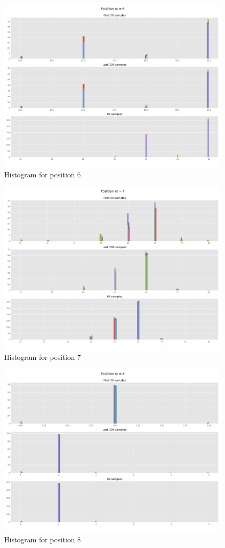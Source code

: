 \documentclass[]{article}
\begin{document}
	\begin{figure}[H]
		\begin{center}
			
			\includegraphics[width=.7\textwidth]{task4/figures/T_2_4/Q2/distribution_pos6.png}
			\caption*{Histogram for position 6}
		\end{center}
	\end{figure}
	
	\begin{figure}[H]
		\begin{center}
			
			\includegraphics[width=.7\textwidth]{task4/figures/T_2_4/Q2/distribution_pos7.png}
			\caption*{Histogram for position 7}
		\end{center}
	\end{figure}
	
	\begin{figure}[H]
		\begin{center}
			
			\includegraphics[width=.7\textwidth]{task4/figures/T_2_4/Q2/distribution_pos8.png}
			\caption*{Histogram for position 8}
		\end{center}
	\end{figure}
	
\end{document}
